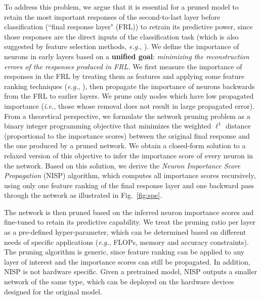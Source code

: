 \documentclass[10pt,twocolumn,letterpaper]{article}
\def\eg{\emph{e.g.}}
\def\ie{\emph{i.e.}}
\begin{document}
To address this problem, we argue that it is essential for a pruned model to retain the most important responses of the second-to-last layer before classification (``final response layer" (FRL)) to retrain its predictive power, since those responses are the direct inputs of the classification task (which is also suggested by feature selection methods, \eg, \cite{Roffo_2015_ICCV}). We define the importance of neurons in early layers based on a \textbf{unified goal}: \emph{minimizing the reconstruction errors of the responses produced in FRL.} 
We first measure the importance of responses in the FRL by treating them as features and applying some feature ranking techniques (\eg, \cite{Roffo_2015_ICCV}), then propagate the importance of neurons backwards from the FRL to earlier layers. We prune only nodes which have low propagated importance (\ie, those whose removal does not result in large propagated error).  From a theoretical perspective, we formulate the network pruning problem as a binary integer programming objective that minimizes the weighted $\ell^1$ distance (proportional to the importance scores) between the original final response and the one produced by a pruned network. 
We obtain a closed-form solution to a relaxed version of this objective to infer the importance score of every neuron in the network. 
Based on this solution, we derive the \textit{Neuron Importance Score Propagation} (NISP) algorithm, which computes all importance scores recursively, using only one feature ranking of the final response layer and one backward pass through the network as illustrated in Fig.~\ref{fig:spe}.

The network is then pruned based on the inferred neuron
importance scores and fine-tuned to retain its predictive capability.
We treat the pruning ratio per layer as a pre-defined hyper-parameter, which can be determined based on different needs of specific applications (\eg, FLOPs, memory and accuracy constraints). The pruning algorithm is generic, since feature ranking can be applied to any layer of interest and the importance scores can still be propagated. In addition, NISP is not hardware specific. Given a pretrained model, NISP outputs a smaller network of the same type, which can be deployed on the hardware devices designed for the original model.
\end{document}
